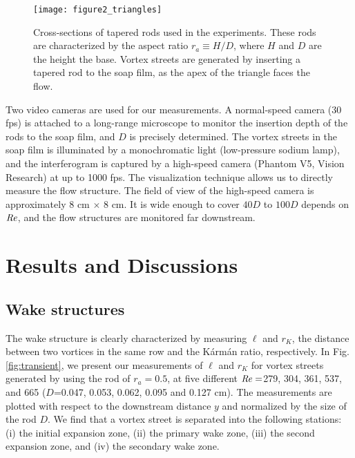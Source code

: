 \documentclass[english, aps, prl, longbibliography, preprint]{revtex4-1}
\newcommand\Reynolds{{\it Re}}
\begin{document}
\begin{figure}
\begin{centering}
\texttt{[image: figure2\_triangles]}
\par
\end{centering}
\caption{
Cross-sections of tapered rods used in the experiments. 
These rods are characterized by the aspect ratio $r_a\equiv H/D$, where $H$ and $D$ are the height the base.
Vortex streets are generated by inserting a tapered rod to the soap film, as the apex of the triangle faces the flow.
\label{fig:experimentalsetup}}
\end{figure}

Two video cameras are used for our measurements. 
A normal-speed camera (30 fps) is attached to a long-range microscope to monitor the insertion depth of the rods to the soap film, and $D$ is precisely determined.
The vortex streets in the soap film is illuminated by a monochromatic light (low-pressure sodium lamp), and the interferogram is captured by a high-speed camera (Phantom V5, Vision Research) at up to 1000 fps.
The visualization technique allows us to directly measure the flow structure.
The field of view of the high-speed camera is approximately 8 cm $\times$ 8 cm.
It is wide enough to cover $40D$ to $100D$ depends on $\Reynolds$, and the flow structures are monitored far downstream.



\section{Results and Discussions}

\subsection{Wake structures}

The wake structure is clearly characterized by measuring $\ell$ and $r_K$, the distance between two vortices in the same row and the K\'{a}rm\'{a}n ratio, respectively.
In Fig. \ref{fig:transient}, we present our measurements of $\ell$ and $r_K$ for vortex streets generated by using the rod of $r_a=0.5$, at five different $\Reynolds=$279, 304, 361, 537, and 665 ($D$=0.047, 0.053, 0.062, 0.095 and 0.127 cm).
The measurements are plotted with respect to the downstream distance $y$ and normalized by the size of the rod $D$.
We find that a vortex street is separated into the following stations: (i) the initial expansion zone, (ii) the primary wake zone, (iii) the second expansion zone, and (iv) the secondary wake zone.
\end{document}
